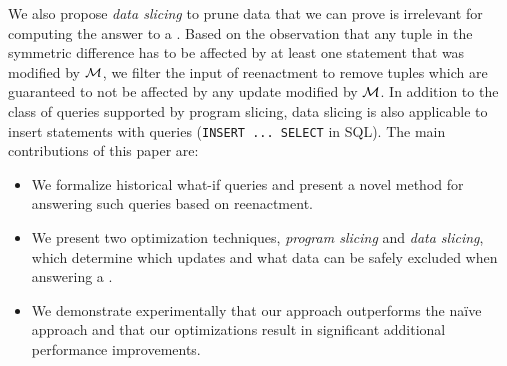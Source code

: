 We also propose \emph{data slicing} to prune data that we can prove is irrelevant for computing the answer to a \abbrHW. Based on the observation that any tuple in the symmetric difference has to be affected by at least one statement that was modified by $\mathcal{M}$, we filter the input of reenactment to remove tuples which are guaranteed to not be affected by any update modified by $\mathcal{M}$. In addition to the class of queries supported by program slicing, data slicing is also applicable to insert statements with queries (\lstinline!INSERT ... SELECT! in SQL).
%
The main contributions of this paper are:
\begin{itemize}[noitemsep,topsep=0pt,parsep=0pt,partopsep=0pt,leftmargin=*]
%
%
%
\item
We formalize historical what-if queries and present a novel method for answering such queries based on reenactment.
%
%
%
%

%

\item We present two optimization techniques, \emph{program slicing} and \emph{data slicing}, which determine which updates and what data can be safely excluded when answering a \abbrHW.

%

\item We demonstrate experimentally that our approach outperforms the naïve approach and that our optimizations result in significant additional performance improvements. %

\end{itemize}

%

%
%
%
%
%
%
%
